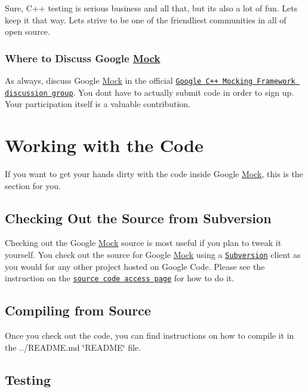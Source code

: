 Sure, C++ testing is serious business and all that, but it\textquotesingle{}s also a lot of fun. Let\textquotesingle{}s keep it that way. Let\textquotesingle{}s strive to be one of the friendliest communities in all of open source.

\subsubsection*{Where to Discuss Google \hyperlink{class_mock}{Mock}}

As always, discuss Google \hyperlink{class_mock}{Mock} in the official \href{http://groups.google.com/group/googlemock}{\tt Google C++ Mocking Framework discussion group}. You don\textquotesingle{}t have to actually submit code in order to sign up. Your participation itself is a valuable contribution.

\section*{Working with the Code}

If you want to get your hands dirty with the code inside Google \hyperlink{class_mock}{Mock}, this is the section for you.

\subsection*{Checking Out the Source from Subversion}

Checking out the Google \hyperlink{class_mock}{Mock} source is most useful if you plan to tweak it yourself. You check out the source for Google \hyperlink{class_mock}{Mock} using a \href{http://subversion.tigris.org/}{\tt Subversion} client as you would for any other project hosted on Google Code. Please see the instruction on the \href{../}{\tt source code access page} for how to do it.

\subsection*{Compiling from Source}

Once you check out the code, you can find instructions on how to compile it in the ../\+R\+E\+A\+D\+ME.md \char`\"{}\+R\+E\+A\+D\+M\+E\char`\"{} file.

\subsection*{Testing}

